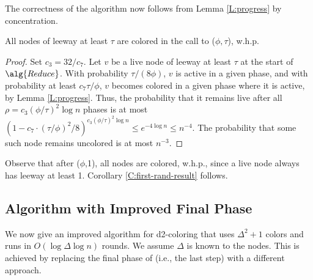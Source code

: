 The correctness of the algorithm now follows from Lemma \ref{L:progress} by concentration.

\begin{theorem}
All nodes of leeway at least $\tau$ are colored in the call to ($\phi,\tau$), w.h.p.
\label{T:reduce-correct}
\end{theorem}

\begin{proof}
Set $c_3 = 32/c_7$. 
Let $v$ be a live node of leeway at least $\tau$ at the start of $\alg{Reduce}$.
With probability $\tau/(8\phi)$, $v$ is active in a given phase, and with
probability at least $c_7 \tau/\phi$, $v$ becomes colored in a given phase where it is active, by Lemma \ref{L:progress}. Thus, the probability that it remains live after all $\rho = c_3 (\phi/\tau)^2 \log n$ phases is at most 
$(1-c_7\cdot(\tau/\phi)^2/8)^{c_3 (\phi/\tau)^2 \log n} \le e^{-4\log n} \le n^{-4}$.
The probability that some such node remains uncolored is at most $n^{-3}$.
\end{proof}



Observe that after ($\phi$,1), all nodes are colored, w.h.p., since a live node always has leeway at least 1. 
Corollary \ref{C:first-rand-result} follows.


\subsection{Algorithm with Improved Final Phase}

We now give an improved algorithm for d2-coloring that uses $\Delta^2+1$ colors and runs in $O(\log \Delta\log n)$ rounds. We assume $\Delta$ is known to the nodes.
This is achieved by replacing the final phase of  (i.e., the last step) with a different approach.

